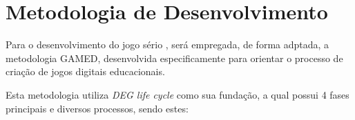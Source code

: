 \section{Metodologia de Desenvolvimento}

Para o desenvolvimento do jogo sério \cite{mouaheb2012serious}, será empregada,
de forma adptada, a metodologia GAMED, desenvolvida especificamente para
orientar o processo de criação de jogos digitais educacionais.


Esta metodologia utiliza \emph{DEG life cycle} como sua fundação,
a qual possui 4 fases principais e diversos processos, sendo estes:

